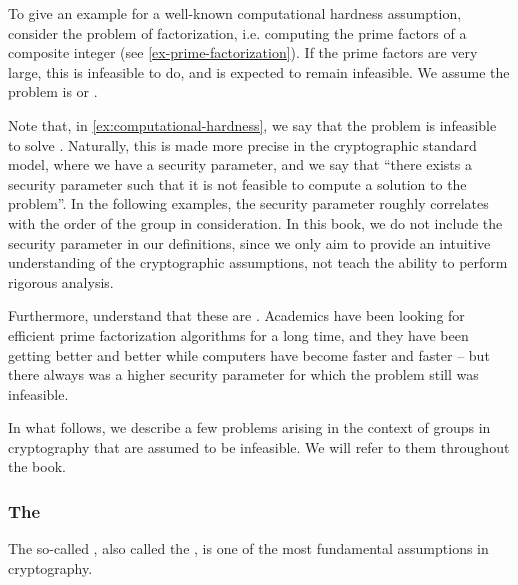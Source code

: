 \begin{example}\label{ex:computational-hardness}

To give an example for a well-known computational hardness assumption, consider the problem of factorization, i.e. computing the prime factors of a composite integer (see \examplename{} \ref{ex-prime-factorization}). If the prime factors are very large, this is infeasible to do, and is expected to remain infeasible. We assume the problem is  or .

\end{example}

Note that, in  \examplename{} \ref{ex:computational-hardness}, {we say that} the problem is infeasible to solve . Naturally, this is made more precise in the cryptographic standard model, where we have a security parameter, and we say that ``there exists a security parameter such that it is not feasible to compute a solution to the problem''. In the following examples, the security parameter roughly correlates with the order of the group in consideration. In this book, we do not include the security parameter in our definitions, since we only aim to provide an intuitive understanding of the cryptographic assumptions, not teach the ability to perform rigorous analysis.

Furthermore, understand that these are . Academics have been looking for efficient prime factorization algorithms for a long time, and they have been getting better and better while computers have become faster and faster -- but there always was a higher security parameter for which the problem still was infeasible.%

In what follows, we describe a few problems arising in the context of groups in cryptography that are assumed to be infeasible. We will refer to them throughout the book.


\subsubsection{The }
\label{def:DL-secure}
The so-called , also called the , is one of the most fundamental assumptions in cryptography. 

